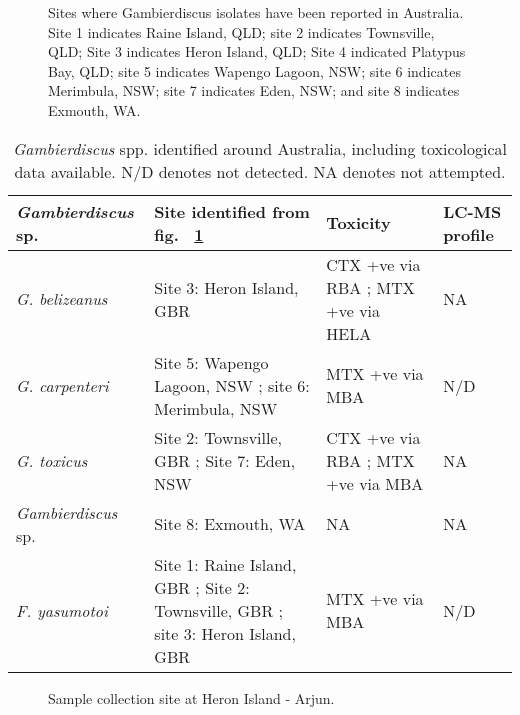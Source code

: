 \documentclass[12pt]{article}
\begin{document}
\FloatBarrier
\begin{figure} 
\caption{Sites where Gambierdiscus isolates have been reported in Australia. Site 1 indicates Raine Island, QLD; site 2 indicates Townsville, QLD; Site 3 indicates Heron Island, QLD; Site 4 indicated Platypus Bay, QLD; site 5 indicates Wapengo Lagoon, NSW; site 6 indicates Merimbula, NSW; site 7 indicates Eden, NSW; and site 8 indicates Exmouth, WA.​} 
\label{fig:OzSites}
\end{figure}
 \FloatBarrier
\begin{table}
\caption{\emph{Gambierdiscus} spp. identified around Australia, including toxicological data available. N/D denotes not detected. NA denotes not attempted.}
\label{tbl:OzTable}
\begin{tabular}{ | p{3.3cm} | p{4cm} | p{4.5cm} | p{2.3cm} | }
\hline
 \textbf{\emph{Gambierdiscus} sp.} & \textbf{Site identified from fig. ~\ref{fig:OzSites}} & \textbf{Toxicity}  & \textbf{LC-MS profile}  \\
 \hline
 \emph{G. belizeanus}  & Site 3: Heron Island, GBR \citep{murray2014molecular} & CTX +ve via RBA \citep{chinain2010growth}; MTX +ve via HELA \citep{holland2013differences} & NA  \\
 \hline
 \emph{G. carpenteri} &Site 5: Wapengo Lagoon, NSW \citep{kohli2014high}; site 6:  Merimbula, NSW  \citep{kohli2014high}& MTX +ve via MBA \citep{kohli2014high} & N/D \citep{kohli2014high}\\
 \hline
 \emph{G. toxicus} & Site 2: Townsville, GBR \citep{hallegraeff2010algae}; Site 7: Eden, NSW \citep{hallegraeff2010algae} & CTX +ve via RBA \citep{chinain2010growth}; MTX +ve via MBA \citep{chinain1999morphology} & NA \\
  \hline
  \emph{Gambierdiscus} sp. & Site 8: Exmouth, WA \citep{kohli2014cob}& NA & NA \\
  \hline
 \emph{F. yasumotoi}  & Site 1: Raine Island, GBR \citep{murray2014molecular}; Site 2: Townsville, GBR \citep{murray2014molecular}; site 3: Heron Island, GBR \citep{murray2014molecular}& MTX +ve via MBA \citep{holmes1998gambierdiscus} & N/D \citep{rhodes2014gambierdiscus}\\
  \hline
\end{tabular}
\end{table}

\FloatBarrier 
\begin{figure} 
\caption{Sample collection site at Heron Island - Arjun.} 
\label{fig:HeronMap}
\end{figure} 
\end{document}
